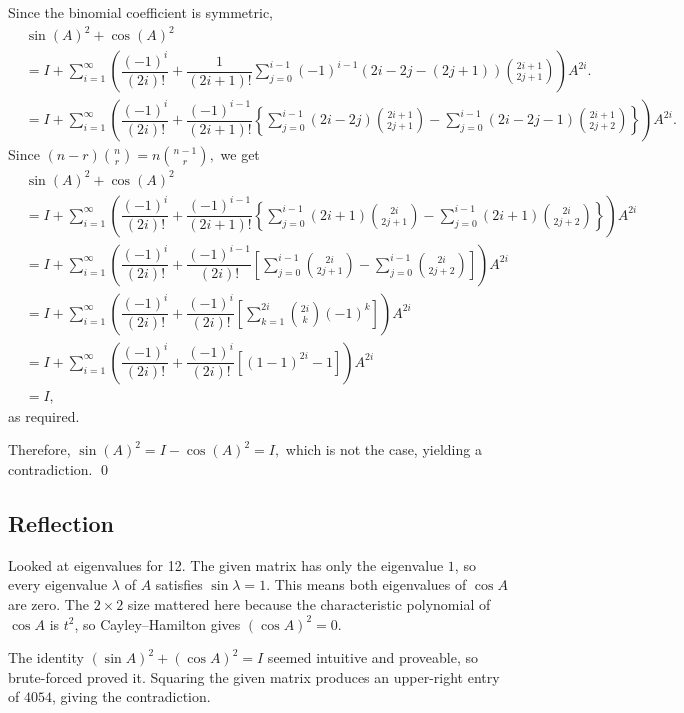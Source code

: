 \documentclass[12pt]{article}
\begin{document}
\begin{enumerate}
    Since the binomial coefficient is symmetric,
    \begin{align*}
      &\sin(A)^2 + \cos(A)^2 \\&= I + \sum_{i = 1}^{\infty}
      \left(\dfrac{(-1)^i}{(2i)!} + \dfrac{1}{(2i + 1)!}\sum_{j =
        0}^{i - 1} (-1)^{i - 1} (2i - 2j - (2j + 1)){2i + 1 \choose 2j
      + 1} \right)A^{2i}.\\
      &= I + \sum_{i = 1}^{\infty} \left(\dfrac{(-1)^i}{(2i)!} +
        \dfrac{(-1)^{i - 1}}{(2i + 1)!}\left\{\sum_{j = 0}^{i - 1}(2i -
          2j){2i + 1 \choose 2j + 1}  - \sum_{j = 0}^{i - 1} (2i - 2j -
      1){2i + 1 \choose 2j + 2}\right\}\right)A^{2i}.
    \end{align*}
    Since $(n-r){n \choose r} = n {n -1 \choose r},$ we get
    \begin{align*}
      &\sin (A)^2 + \cos (A)^2 \\
      &= I + \sum_{i = 1}^{\infty} \left(\dfrac{(-1)^i}{(2i)!} +
        \dfrac{(-1)^{i - 1}}{(2i + 1)!}\left\{\sum_{j = 0}^{i - 1}(2i +
          1){2i\choose 2j + 1}  - \sum_{j = 0}^{i - 1} (2i + 1){2i
      \choose 2j + 2}\right\}\right)A^{2i} \\
      &= I + \sum_{i=1}^{\infty}
      \left(
        \dfrac{(-1)^i}{(2i)!}
        + \dfrac{(-1)^{i-1}}{(2i)!}
        \left[
          \sum_{j=0}^{i-1} \binom{2i}{2j+1}
          - \sum_{j=0}^{i-1} \binom{2i}{2j+2}
        \right]
      \right) A^{2i} \\
      &= I + \sum_{i=1}^{\infty}
      \left(
        \dfrac{(-1)^i}{(2i)!}
        + \dfrac{(-1)^{i}}{(2i)!}
        \left[
          \sum_{k = 1}^{2i} {2i \choose k} (-1)^{k}
        \right]
      \right) A^{2i}  \\
      &= I + \sum_{i=1}^{\infty}
      \left(
        \dfrac{(-1)^i}{(2i)!}
        + \dfrac{(-1)^{i}}{(2i)!}
        \left[
          (1 - 1)^{2i} - 1
        \right]
      \right) A^{2i}  \\
      &= I,
    \end{align*}
    as required.

    Therefore, $\sin(A)^2 = I - \cos(A)^2 = I,$ which is not the
    case, yielding a contradiction. \qed
\end{enumerate}

\subsection{Reflection}
Looked at eigenvalues for 12. The given matrix has only the
eigenvalue \(1\), so every eigenvalue \(\lambda\) of \(A\) satisfies
\(\sin\lambda=1\). This means both eigenvalues of \(\cos A\) are
zero. The \(2\times2\) size mattered here because the characteristic
polynomial of \(\cos A\) is \(t^2\), so Cayley–Hamilton gives \((\cos A)^2=0\).

The identity \((\sin A)^2+(\cos A)^2=I\) seemed intuitive and
proveable, so brute-forced proved it. Squaring the given matrix
produces an upper-right entry of \(4054\), giving the contradiction.
\end{document}
